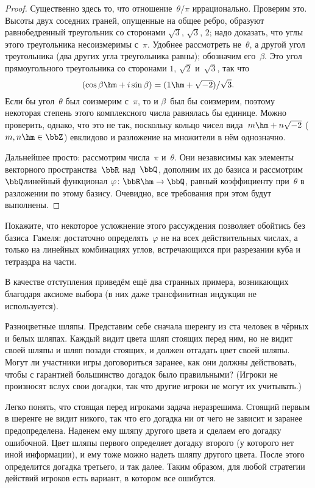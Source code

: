 \begin{proof}
Существенно здесь то, что отношение~$\theta/\pi$ иррационально.
Проверим это. Высоты двух соседних граней, опущенные на общее
ребро, образуют равнобедренный треугольник со сторонами
$\sqrt{3}$, $\sqrt{3}$, $2$; надо доказать, что углы этого
треугольника несоизмеримы с~$\pi$. Удобнее рассмотреть не~$\theta$,
а другой угол треугольника
(два других угла треугольника
равны); обозначим
его~$\beta$. Это угол прямоугольного треугольника со сторонами
$1$, $\sqrt{2}$ и~$\sqrt{3}$, так что $$(\cos \beta \hm+
i\sin\beta)=(1\hm+\sqrt{-2})/\sqrt{3}.$$ Если бы угол~$\theta$ был
соизмерим с~$\pi$, то и $\beta$~был бы соизмерим, поэтому
некоторая степень этого комплексного числа равнялась бы единице.
Можно проверить, однако, что это не так, поскольку кольцо
чисел вида~$m\hm+n\sqrt{-2}$ ($m,n\hm\in \bbZ$) евклидово и
разложение на множители в нём однозначно.

Дальнейшее просто: рассмотрим числа~$\pi$ и~$\theta$. Они
независимы как элементы векторного пространства~$\bbR$ над~$\bbQ$,
дополним их до базиса и рассмотрим $\bbQ$\д линейный
функционал $\varphi\colon\bbR\hm\to\bbQ$, равный коэффициенту при~$\theta$
в разложении по этому базису. Очевидно, все требования
при этом будут выполнены.
\end{proof}

\begin{problem}
Покажите, что некоторое усложнение этого рассуждения позволяет
обойтись без базиса~Гамеля: достаточно определять~$\varphi$
не на всех действительных числах, а только на линейных
комбинациях углов, встречающихся при разрезании куба и
тетраэдра на части.
\end{problem}

\smallskip
В качестве отступления приведём
ещё два странных примера, возникающих благодаря аксиоме
выбора (в них даже трансфинитная индукция не используется).

\textsf{Разноцветные шляпы}. Представим себе сначала шеренгу из
ста человек в чёрных и белых шляпах. Каждый видит цвета шляп
стоящих перед ним, но не видит своей шляпы и шляп позади
стоящих, и должен отгадать цвет своей шляпы. Могут ли участники
игры договориться заранее, как они должны действовать, чтобы с
гарантией большинство догадок было правильными? (Игроки не
произносят вслух свои догадки, так что другие игроки не могут их
учитывать.)

Легко понять, что стоящая перед игроками задача неразрешима.
Стоящий первым в шеренге не видит никого, так что его догадка ни
от чего не зависит и заранее предопределена. Наденем ему шляпу
другого цвета и сделаем его догадку ошибочной. Цвет шляпы
первого определяет догадку второго (у которого нет иной
информации), и ему тоже можно надеть шляпу другого цвета. После
этого определится догадка третьего, и так далее. Таким образом,
для любой стратегии действий игроков есть вариант, в котором все
ошибутся.

